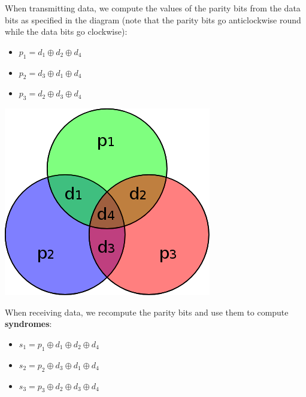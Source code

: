 \documentclass[a4paper, 11pt]{article}
\begin{document}
{{\begin{minipage}[t]{0.8\textwidth}
        When transmitting data, we compute the values of the parity bits from the data bits as specified in the diagram (note that the parity bits go anticlockwise round while the data bits go clockwise):
        \begin{itemize}
        \item \(p_1 = d_1 \oplus d_2 \oplus d_4\)
        \item \(p_2 = d_3 \oplus d_1 \oplus d_4\)
        \item \(p_3 = d_2 \oplus d_3 \oplus d_4\)
        \end{itemize}
        \vspace{3mm}
        \end{minipage}
        \hspace{3mm}
        \begin{minipage}[t]{0.15\textwidth}
        \vspace{0pt}
        \centering
        \includegraphics[width=\textwidth]{hamming74.png}
        \end{minipage}

        When receiving data, we recompute the parity bits and use them to compute \textbf{syndromes}:
        \begin{itemize}
        \item \(s_1 = p_1 \oplus d_1 \oplus d_2 \oplus d_4\)
        \item \(s_2 = p_2 \oplus d_3 \oplus d_1 \oplus d_4\)
        \item \(s_3 = p_3 \oplus d_2 \oplus d_3 \oplus d_4\)
        \end{itemize}

}}
\end{document}
